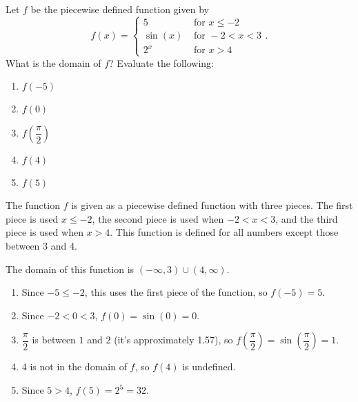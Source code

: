 \documentclass[nooutcomes]{ximera}
\begin{document}
	\begin{example}
		Let $f$ be the piecewise defined function given by
		$$ f(x) =  \begin{cases} 5 & \text{ for }  x \leq -2 \\ \sin(x) & \text{ for } -2 < x < 3\\ 2^x & \text{ for } x > 4 \end{cases}.$$
				What is the domain of $f$? Evaluate the following: 
		\begin{enumerate}
			\item $f(-5)$
			\item $f(0)$
			\item $f\left( \dfrac{\pi}{2} \right)$
			\item $f(4)$
			\item $f(5)$
		\end{enumerate}

		\begin{explanation}
		
			The function $f$ is given as a piecewise defined function with three pieces. The first piece is used $x \leq -2$, the second piece is used 
			when $-2 < x < 3$, and the third piece is used when $x > 4$. This function is defined for all numbers except those between 3 and 4.
			
			The domain of this function is $(-\infty, 3) \cup (4, \infty)$.
			\begin{enumerate}
				\item Since $-5 \leq -2$, this uses the first piece of the function, so $f(-5)=5$.
				\item Since $-2 < 0 < 3$, $f(0)=\sin(0)=0$.
				\item $\dfrac{\pi}{2}$ is between $1$ and $2$ (it's approximately 1.57), so $f\left( \dfrac{\pi}{2} \right) = \sin\left( \dfrac{\pi}{2} \right) = 1$.
				\item $4$ is not in the domain of $f$, so $f(4)$ is undefined.
				\item Since $5 > 4$, $f(5) = 2^5 = 32$.
			\end{enumerate}
		\end{explanation}
	\end{example}
\end{document}
